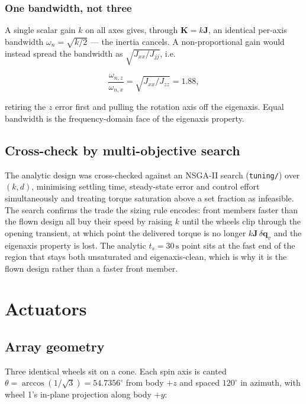 \documentclass[conference,10pt,a4paper]{IEEEtran}
\newcommand{\vect}[1]{\bm{#1}}
\newcommand{\mat}[1]{\bm{#1}}
\newcommand{\unit}[1]{\ensuremath{\,\mathrm{#1}}}
\begin{document}
\subsubsection{One bandwidth, not three}

A single scalar gain $k$ on all axes gives, through $\mat{K}=k\mat{J}$, an
identical per-axis bandwidth $\omega_n=\sqrt{k/2}$ --- the inertia cancels. A
non-proportional gain would instead spread the bandwidth as
$\sqrt{J_{xx}/J_{jj}}$, i.e.\

\begin{equation}
\frac{\omega_{n,z}}{\omega_{n,x}} = \sqrt{J_{xx}/J_{zz}} = 1.88 ,
\label{eq:asymmetry}
\end{equation}

retiring the $z$ error first and pulling the rotation axis off the eigenaxis.
Equal bandwidth is the frequency-domain face of the eigenaxis property.

\subsection{Cross-check by multi-objective search}
\label{sec:ga}

The analytic design was cross-checked against an NSGA-II search
\cite{deb2002} (\texttt{tuning/}) over $(k,d)$, minimising settling time,
steady-state error and control effort simultaneously and treating torque
saturation above a set fraction as infeasible. The search confirms the
trade the sizing rule encodes: front members faster than the flown design all
buy their speed by raising $k$ until the wheels clip through the opening
transient, at which point the delivered torque is no longer $k\mat{J}\,
\delta\vect{q}_v$ and the eigenaxis property is lost. The analytic $t_s=30
\unit{s}$ point sits at the fast end of the region that stays both unsaturated
and eigenaxis-clean, which is why it is the flown design rather than a
faster front member.

\section{Actuators}
\label{sec:actuators}

\subsection{Array geometry}

Three identical wheels sit on a cone. Each spin axis is canted
$\theta=\arccos(1/\sqrt{3})=54.7356^\circ$ from body $+z$ and spaced
$120^\circ$ in azimuth, with wheel 1's in-plane projection along body $+y$:
\end{document}
